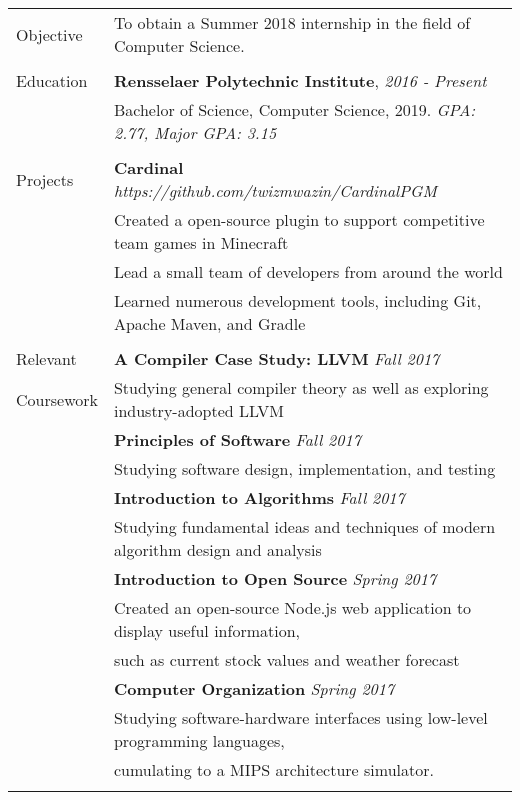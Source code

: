 \documentclass[letterpaper,10pt,oneside]{article}
\begin{document}
\noindent
\begin{tabular}{@{} l l}

  \Large{Objective}
  & To obtain a Summer 2018 internship in the field of Computer Science. \\
  & \\

  \Large{Education}
  & \textbf{Rensselaer Polytechnic Institute}, \textit{2016 - Present} \\
  & Bachelor of Science, Computer Science, 2019. \textit{GPA: 2.77, Major GPA: 3.15} \\
  & \\

  \Large{Projects}
  & \textbf{Cardinal} \textit{https://github.com/twizmwazin/CardinalPGM} \\
  & Created a open-source plugin to support competitive team games in Minecraft \\
  & Lead a small team of developers from around the world \\
  & Learned numerous development tools, including Git, Apache Maven, and Gradle \\
  & \\

  \Large{Relevant}
  & \textbf{A Compiler Case Study: LLVM} \textit{Fall 2017} \\
  \Large{Coursework}
  & Studying general compiler theory as well as exploring industry-adopted LLVM \\
  & \textbf{Principles of Software} \textit{Fall 2017} \\
  & Studying software design, implementation, and testing \\
  & \textbf{Introduction to Algorithms} \textit{Fall 2017} \\
  & Studying fundamental ideas and techniques of modern algorithm design and analysis \\
  & \textbf{Introduction to Open Source} \textit{Spring 2017} \\
  & Created an open-source Node.js web application to display useful information, \\
  & such as current stock values and weather forecast \\
  & \textbf{Computer Organization} \textit{Spring 2017} \\
  & Studying software-hardware interfaces using low-level programming languages, \\
  & cumulating to a MIPS architecture simulator. \\
  & \\


\end{tabular}
\end{document}
